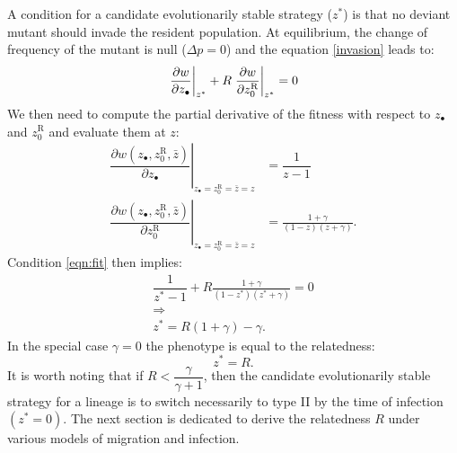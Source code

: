 \documentclass[10pt]{article}
\begin{document}
\begin{multicols}{2}
    A condition for a candidate evolutionarily stable strategy ($z^*$) is that no deviant mutant should invade the resident population. At equilibrium, the change of frequency of the mutant is null ($\Delta p=0$) and the equation \eqref{invasion} leads to:
    \begin{equation}
    \left. \dfrac{\partial w}{\partial z_\bullet} \right\vert_{z^*} +  R \left. \dfrac{\partial w}{\partial z_0^{\mathrm{R}}} \right\vert_{z^*} =0 \label{eqn:fit}\\
  \end{equation}
  We then need to compute the partial derivative of the fitness with respect to $z_\bullet$ and $z_0^{\mathrm{R}}$ and evaluate them at $z$:
  \begin{align}
   \left. \dfrac{\partial w(z_\bullet ,z_0^{\mathrm{R}} , \bar{z} )}{\partial z_\bullet} \right\vert_{z_\bullet = z_0^{\mathrm{R}} = \bar{z}=z} &= \dfrac{1}{ z-1 } \\
   \left. \dfrac{\partial w(z_\bullet ,z_0^{\mathrm{R}} , \bar{z} )}{\partial z_0^{\mathrm{R}}} \right\vert_{z_\bullet = z_0^{\mathrm{R}} = \bar{z}=z} &= \frac{1+\gamma}{(1-z)(z+\gamma )}.
  \end{align}
  Condition \eqref{eqn:fit} then implies:
    \begin{gather}
  \dfrac{1}{ z^*-1 } + R \frac{1+\gamma}{(1-z^*)(z^*+\gamma )} =0 \\
    \Rightarrow \nonumber \\
  z^*=R(1+ \gamma) - \gamma.
  \end{gather}
  In the special case $\gamma=0$ the phenotype is equal to the relatedness:
  \begin{equation}
  z^*=R.
  \end{equation}
  It is worth noting that if $R<\dfrac{\gamma}{\gamma+1}$, then the candidate evolutionarily stable strategy for a lineage is to switch necessarily to type II by the time of infection $(z^*=0)$.
  The next section is dedicated to derive the relatedness $R$ under various models of migration and infection.

\end{multicols}
\end{document}
